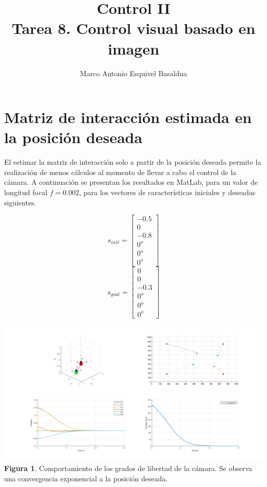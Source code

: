 \documentclass{article}
\title{Control II\\
	\large Tarea 8. Control visual basado en imagen}
\author{Marco Antonio Esquivel Basaldua}
\begin{document}
\maketitle

	\section{Matriz de interacci\'on estimada en la posici\'on deseada}
	El estimar la matriz de interacci\'on solo a partir de la posici\'on deseada permite la realizaci\'on de menos c\'alculos al momento de llevar a cabo el control de la c\'amara. A continuaci\'on se presentan los resultados en MatLab, para un valor de longitud focal $f=0.002$, para los vectores de caracter\'isticas iniciales y deseadas siguientes.\newline
	
	\begin{center}
	\begin{multicols}{2}
	$$
	s_{init} = \left[\begin{matrix}
	-0.5\\0\\-0.8\\0^o\\0^o\\0^o
	\end{matrix}\right]
	$$
	$$
	s_{goal} = \left[\begin{matrix}
	0\\0\\-0.3\\0^o\\0^o\\0^o
	\end{matrix}\right]
	$$
	\end{multicols}
	\includegraphics[scale=0.3]{fig2.png}\\
	{\footnotesize \textbf{Figura 1}. Comportamiento de los grados de libertad de la c\'amara. Se observa una convergencia exponencial a la posici\'on deseada.}
	\end{center}\newpage
	
\end{document}
